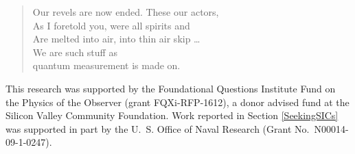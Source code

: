 \documentclass[aps,pra,superscriptaddress,10pt,tightenlines,twocolumn,nofootinbib]{revtex4}
\begin{document}
\begin{flushright}
\baselineskip=13pt
\parbox{3.4in}{
\begin{verse}
Our revels are now ended.  These our actors, \\
As I foretold you, were all spirits and \\
Are melted into air, into thin air skip \ldots \\
We are such stuff as \\
\hspace*{0.5cm} quantum measurement is made on.
\end{verse}}
\end{flushright}

\vfill

\acknowledgments

This research was supported by the Foundational Questions Institute Fund on the Physics of the Observer (grant FQXi-RFP-1612), a donor advised fund at the Silicon Valley Community Foundation.  Work reported in Section \ref{SeekingSICs} was supported in part by the U.~S. Office of Naval Research (Grant No.\ N00014-09-1-0247).  




\end{document}
